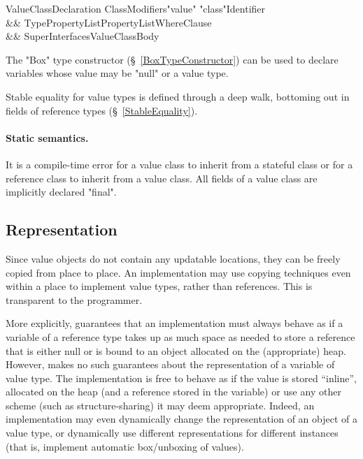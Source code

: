 \begin{grammar}
ValueClassDeclaration \:
      ClassModifiers\opt \xcd"value" \xcd"class"\opt Identifier  \\
   && TypePropertyList\opt PropertyList\opt WhereClause\opt \\
   && Super\opt Interfaces\opt ValueClassBody \\
\end{grammar}


The \xcd"Box" type constructor (\S~\ref{BoxTypeConstructor}) can
be used to declare variables whose value may be \xcd"null" or a value
type.

Stable equality for value types is defined through a deep walk,
bottoming out in fields of reference types (\S~\ref{StableEquality}).

\paragraph{Static semantics.}
It is a compile-time error for a value class to inherit from a
stateful class or for a reference class to inherit from a value
class. All fields of a value class are implicitly declared \xcd"final".

\subsection{Representation}

Since value objects do not contain any updatable locations, they can
be freely copied from place to place. An implementation may use
copying techniques even within a place to implement value types,
rather than references. This is transparent to the programmer.

More explicitly, \Xten{} guarantees that an implementation must always
behave as if a variable of a reference type takes up as much space as
needed to store a reference that is either null or is bound to an
object allocated on the (appropriate) heap. However, \Xten{} makes no
such guarantees about the representation of a variable of value
type. The implementation is free to behave as if the value is stored
``inline'', allocated on the heap (and a reference stored in the
variable) or use any other scheme (such as structure-sharing) it may
deem appropriate. Indeed, an implementation may even dynamically
change the representation of an object of a value type, or dynamically
use different representations for different instances (that is,
implement automatic box/unboxing of values).

